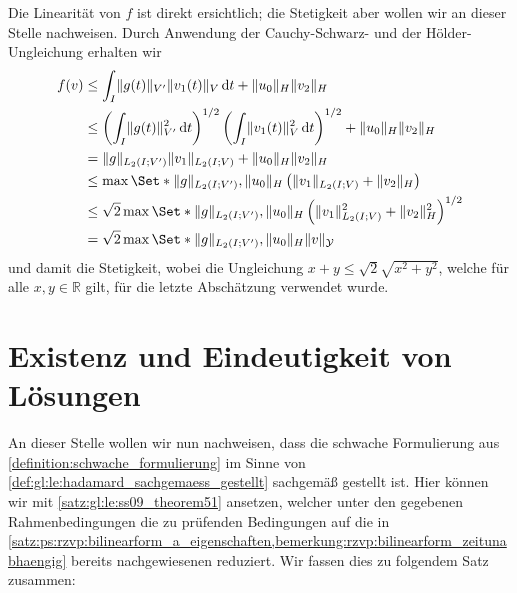 \begin{Bemerkung}
    Die Linearität von $f$ ist direkt ersichtlich; die Stetigkeit aber wollen wir an dieser Stelle nachweisen.
    Durch Anwendung der Cauchy-Schwarz- und der Hölder-Ungleichung erhalten wir
    \begin{equation}
        \begin{aligned}
            f(v)
            &\leq \int_{I} \norm{g(t)}_{V'} \norm{v_{1}(t)}_{V} \diff t + \norm{u_{0}}_{H} \norm{v_{2}}_{H}
            \\&\leq \left( \int_{I} \norm{g(t)}^{2}_{V'} \diff t \right)^{1/2} \left( \int_{I} \norm{v_{1}(t)}^{2}_{V} \diff t \right)^{1/2} + \norm{u_{0}}_{H} \norm{v_{2}}_{H}
            \\&= \norm{g}_{L_{2}(I; V')} \norm{v_{1}}_{L_{2}(I; V)} + \norm{u_{0}}_{H} \norm{v_{2}}_{H}
            \\&\leq \max\Set*{\norm{g}_{L_{2}(I; V')}, \norm{u_{0}}_{H}} \left( \norm{v_{1}}_{L_{2}(I; V)} + \norm{v_{2}}_{H} \right)
            \\&\leq \sqrt{2} \max\Set*{\norm{g}_{L_{2}(I; V')}, \norm{u_{0}}_{H}} \left( \norm{v_{1}}_{L_{2}(I; V)}^{2} + \norm{v_{2}}_{H}^{2} \right)^{1/2}
            \\&= \sqrt{2} \max\Set*{\norm{g}_{L_{2}(I; V')}, \norm{u_{0}}_{H}} \norm{v}_{\mathcal Y}
        \end{aligned}
    \end{equation}
    und damit die Stetigkeit, wobei die Ungleichung $x + y \leq \sqrt{2} \sqrt{x^2 + y^2}$, welche für alle $x, y \in \mathbb{R}$ gilt, für die letzte Abschätzung verwendet wurde.
\end{Bemerkung}


\section{Existenz und Eindeutigkeit von Lösungen} %
\label{sub:ps:eel:existenz_und_eindeutigkeit_von_loesungen}

An dieser Stelle wollen wir nun nachweisen, dass die schwache Formulierung aus \cref{definition:schwache_formulierung} im Sinne von \cref{def:gl:le:hadamard_sachgemaess_gestellt} sachgemäß gestellt ist.
Hier können wir mit \cref{satz:gl:le:ss09_theorem51} ansetzen, welcher unter den gegebenen Rahmenbedingungen die zu prüfenden Bedingungen auf die in \cref{satz:ps:rzvp:bilinearform_a_eigenschaften,bemerkung:rzvp:bilinearform_zeitunabhaengig} bereits nachgewiesenen reduziert.
Wir fassen dies zu folgendem Satz zusammen:

